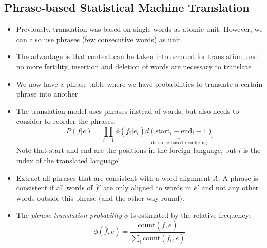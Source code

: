 \subsection{Phrase-based Statistical Machine Translation}
\begin{itemize}
	\item Previously, translation was based on single words as atomic unit. However, we can also use phrases (few consecutive words) as unit 
	\item The advantage is that context can be taken into account for translation, and no more fertility, insertion and deletion of words are necessary to translate
	\item We now have a phrase table where we have probabilities to translate a certain phrase into another
	\item The translation model uses phrases instead of words, but also needs to consider to reorder the phrases:
	$$P(f|e) = \prod\limits_{i=1} \phi(\overline{f}_i | \overline{e}_i) \underbrace{d(\text{start}_i - \text{end}_i -1)}_{\text{distance-based reordering}}$$
	Note that $\text{start}$ and $\text{end}$ are the positions in the foreign language, but $i$ is the index of the translated language!
	\item Extract all phrases that are consistent with a word alignment $A$. A phrase is consistent if all words of $\overline{f}'$ are only aligned to words in $\overline{e}'$ and not any other words outside this phrase (and the other way round).
	\item The \textit{phrase translation probability} $\phi$ is estimated by the relative frequency:
	$$\phi(\overline{f}, \overline{e}) = \frac{\text{count}(\overline{f}, \overline{e})}{\sum_i \text{count}(\overline{f}_i, \overline{e})}$$
\end{itemize}